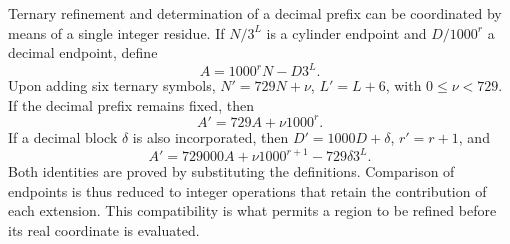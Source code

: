 Ternary refinement and determination of a decimal prefix
can be coordinated by means of a single integer residue. If \(N/3^L\)
is a cylinder endpoint and \(D/1000^r\) a decimal endpoint, define
\[
 A=1000^rN-D3^L.
\]
Upon adding six ternary symbols, \(N'=729N+\nu\),
\(L'=L+6\), with \(0\le\nu<729\). If the decimal prefix remains
fixed, then
\[
 A'=729A+\nu1000^r.
\]
If a decimal block \(\delta\) is also incorporated, then
\(D'=1000D+\delta\), \(r'=r+1\), and
\begin{equation}
 A'=729000A+\nu1000^{r+1}-729\delta3^L.
 \label{eq:residuo-dos-bases}
\end{equation}
Both identities are proved by substituting the definitions. Comparison
of endpoints is thus reduced to integer operations that retain the
contribution of each extension. This compatibility is what permits a region
to be refined before its real coordinate is evaluated.

